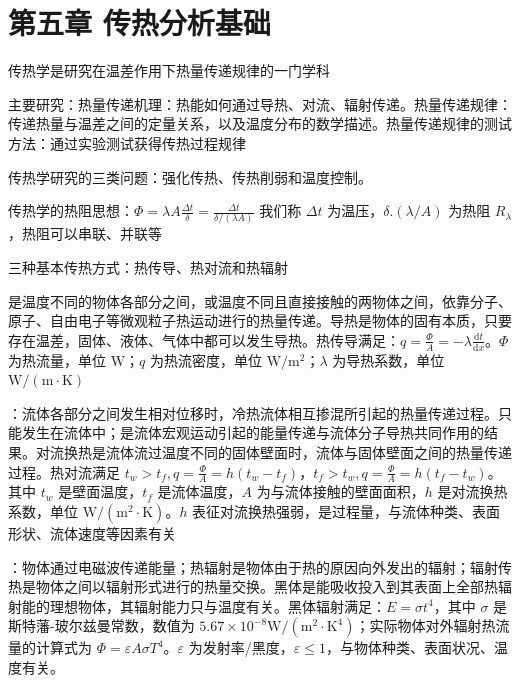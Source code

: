 \section{第五章 \quad 传热分析基础}


传热学是研究在温差作用下热量传递规律的一门学科

主要研究：热量传递机理：热能如何通过导热、对流、辐射传递。热量传递规律：传递热量与温差之间的定量关系，以及温度分布的数学描述。热量传递规律的测试方法：通过实验测试获得传热过程规律

传热学研究的三类问题：强化传热、传热削弱和温度控制。

传热学的热阻思想：$\Phi =\lambda A\frac{\Delta t}{\delta}=\frac{\Delta t}{\delta / (\lambda A)}$ 我们称 $\Delta t$ 为温压，$\delta . (\lambda/A)$ 为热阻 $R_\lambda$，热阻可以串联、并联等

三种基本传热方式：热传导、热对流和热辐射

是温度不同的物体各部分之间，或温度不同且直接接触的两物体之间，依靠分子、原子、自由电子等微观粒子热运动进行的热量传递。导热是物体的固有本质，只要存在温差，固体、液体、气体中都可以发生导热。热传导满足：$q=\frac{\Phi}{A}=-\lambda \frac{\mathrm{d}t}{\mathrm{d}x}$。$\Phi$ 为热流量，单位 $\mathrm{W}$；$q$ 为热流密度，单位 $\mathrm{W}/\mathrm{m}^2$；$\lambda$ 为导热系数，单位 $\mathrm{W}/(\mathrm{m}\cdot\mathrm{K})$

：流体各部分之间发生相对位移时，冷热流体相互掺混所引起的热量传递过程。只能发生在流体中；是流体宏观运动引起的能量传递与流体分子导热共同作用的结果。对流换热是流体流过温度不同的固体壁面时，流体与固体壁面之间的热量传递过程。热对流满足 $t_w>t_f,q=\frac{\Phi}{A}=h(t_w-t_f)$，$t_f>t_w,q=\frac{\Phi}{A}=h(t_f-t_w)$。其中 $t_w$ 是壁面温度，$t_f$ 是流体温度，$A$ 为与流体接触的壁面面积，$h$ 是对流换热系数，单位 $\mathrm{W}/(\mathrm{m}^2\cdot\mathrm{K})$。$h$ 表征对流换热强弱，是过程量，与流体种类、表面形状、流体速度等因素有关

：物体通过电磁波传递能量；热辐射是物体由于热的原因向外发出的辐射；辐射传热是物体之间以辐射形式进行的热量交换。黑体是能吸收投入到其表面上全部热辐射能的理想物体，其辐射能力只与温度有关。黑体辐射满足：$E=\sigma t^4$，其中 $\sigma$ 是斯特藩-玻尔兹曼常数，数值为 $5.67\times 10^{-8}\mathrm{W}/(\mathrm{m}^2\cdot\mathrm{K}^4)$；实际物体对外辐射热流量的计算式为 $\Phi =\varepsilon A \sigma T^4$。$\varepsilon$ 为发射率/黑度，$\varepsilon\le 1$，与物体种类、表面状况、温度有关。


